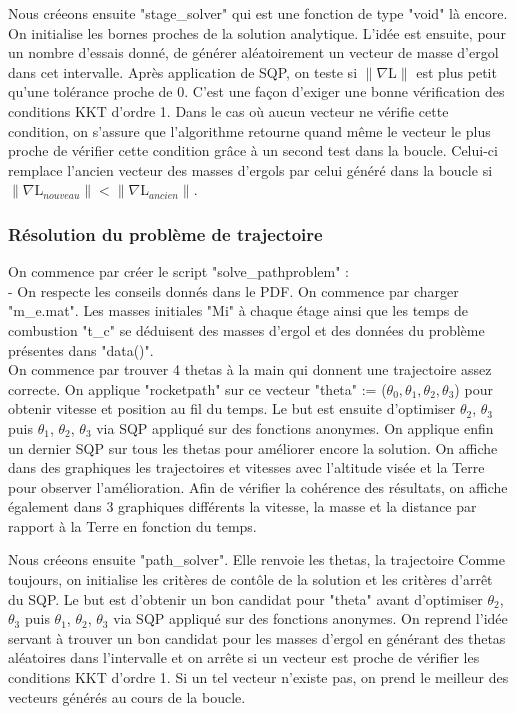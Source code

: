 Nous créeons ensuite "stage\_solver" qui est une fonction de type "void" là encore. On initialise les bornes proches de la solution analytique. L'idée est ensuite, pour un nombre d'essais donné, de générer aléatoirement un vecteur de masse d'ergol dans cet intervalle. Après application de SQP, on teste si $\|    \nabla $L$   \|$ est plus petit qu'une tolérance proche de 0. C'est une façon d'exiger une bonne vérification des conditions KKT d'ordre 1. Dans le cas où aucun vecteur ne vérifie cette condition, on s'assure que l'algorithme retourne quand même le vecteur le plus proche de vérifier cette condition grâce à un second test dans la boucle. Celui-ci remplace l'ancien vecteur des masses d'ergols par celui généré dans la boucle si $\|    \nabla $L$_{nouveau}   \| < \|    \nabla $L$_{ancien}   \|$.\medbreak


\subsubsection{Résolution du problème de trajectoire}\medbreak

On commence par créer le script "solve\_pathproblem" : \\
\indent - On respecte les conseils donnés dans le PDF. On commence par charger "m\_e.mat". Les masses initiales "Mi" à chaque étage ainsi que les temps de combustion "t\_c" se déduisent des masses d'ergol et des données du problème présentes dans "data()".\\
On commence par trouver 4 thetas à la main qui donnent une trajectoire assez correcte. On applique "rocketpath" sur ce vecteur "theta" := ($\theta_0,\theta_1,\theta_2,\theta_3$) pour obtenir vitesse et position au fil du temps. Le but est ensuite d'optimiser $\theta_2$, $\theta_3$ puis $\theta_1$, $\theta_2$, $\theta_3$ via SQP appliqué sur des fonctions anonymes. On applique enfin un dernier SQP sur tous les thetas pour améliorer encore la solution. On affiche dans des graphiques les trajectoires et vitesses avec l'altitude visée et la Terre pour observer l'amélioration. Afin de vérifier la cohérence des résultats, on affiche également dans 3 graphiques différents la vitesse, la masse et la distance par rapport à la Terre en fonction du temps.\medbreak

Nous créeons ensuite "path\_solver". Elle renvoie les thetas, la trajectoire Comme toujours, on initialise les critères de contôle de la solution et les critères d'arrêt du SQP. Le but est d'obtenir un bon candidat pour "theta" avant d'optimiser $\theta_2$, $\theta_3$ puis $\theta_1$, $\theta_2$, $\theta_3$ via SQP appliqué sur des fonctions anonymes. On reprend l'idée servant à trouver un bon candidat pour les masses d'ergol en générant des thetas aléatoires dans l'intervalle et on arrête si un vecteur est proche de vérifier les conditions KKT d'ordre 1. Si un tel vecteur n'existe pas, on prend le meilleur des vecteurs générés au cours de la boucle.\medbreak

